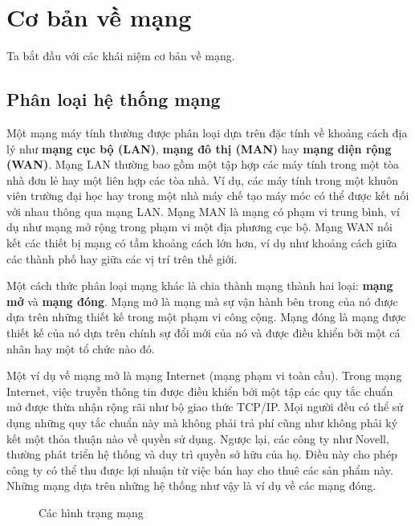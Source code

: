    
\section{Cơ bản về mạng}
\label{sec:4.1}
Ta bắt đầu với các khái niệm cơ bản về mạng.

\subsection*{Phân loại hệ thống mạng}

Một mạng máy tính thường được phân loại dựa trên đặc tính về khoảng cách địa lý như
\textbf{mạng cục bộ (LAN)}, \textbf{mạng đô thị (MAN)} hay \textbf{mạng diện rộng
  (WAN)}. Mạng LAN thường bao gồm một tập hợp các máy tính trong một tòa nhà đơn lẻ hay
một liên hợp các tòa nhà. Ví dụ, các máy tính trong một khuôn viên trường đại học hay
trong một nhà máy chế tạo máy móc có thể được kết nối với nhau thông qua mạng LAN.  Mạng
MAN là mạng có phạm vi trung bình, ví dụ như mạng mở rộng trong phạm vi một địa phương cục
bộ.  Mạng WAN nối kết các thiết bị mạng có tầm khoảng cách lớn hơn, ví dụ như khoảng cách
giữa các thành phố hay giữa các vị trí trên thế giới.

Một cách thức phân loại mạng khác là chia thành mạng thành hai loại: \textbf{mạng mở} và
\textbf{mạng đóng}. Mạng mở là mạng mà sự vận hành bên trong của nó được dựa trên những
thiết kế trong một phạm vi công cộng. Mạng đóng là mạng được thiết kế của nó dựa trên
chính sự đổi mới của nó và được điều khiển bởi một cá nhân hay một tổ chức nào đó.

Một ví dụ về mạng mở là mạng Internet (mạng phạm vi toàn cầu). Trong mạng Internet, việc truyền thông tin được điều khiển bởi một tập các quy tắc chuẩn mở được thừa nhận rộng rãi như bộ giao thức TCP/IP. Mọi người đều có thể sử dụng những quy tắc chuẩn này mà
không phải trả phí cũng như không phải ký kết một thỏa thuận nào về quyền sử dụng. Ngược lại, các công ty như Novell, thường phát triển  hệ thống và duy trì quyền sở hữu của họ. Điều này cho phép công ty có thể thu được lợi nhuận từ việc bán
hay cho thuê các sản phẩm này. Những mạng dựa trên những hệ thống như vậy là ví dụ
về các mạng đóng.

\begin{figure}[tbh] 
\centering
\caption{Các hình trạng mạng}
  \label{fig:fig4.1}
\end{figure}

